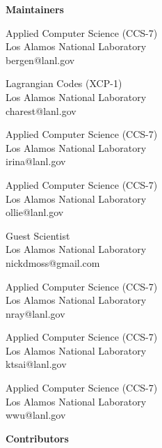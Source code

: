 \begin{multicols}{2}
{\huge \textbf{Maintainers}}

\vspace{0.25cm}

{Applied Computer Science (CCS-7)\\
Los Alamos National Laboratory\\
bergen@lanl.gov}

{Lagrangian Codes (XCP-1)\\
Los Alamos National Laboratory\\
charest@lanl.gov}

{Applied Computer Science (CCS-7)\\
Los Alamos National Laboratory\\
irina@lanl.gov}

{Applied Computer Science (CCS-7)\\
Los Alamos National Laboratory\\
ollie@lanl.gov}

{Guest Scientist\\
Los Alamos National Laboratory\\
nickdmoss@gmail.com}

{Applied Computer Science (CCS-7)\\
Los Alamos National Laboratory\\
nray@lanl.gov}

{Applied Computer Science (CCS-7)\\
Los Alamos National Laboratory\\
ktsai@lanl.gov}

{Applied Computer Science (CCS-7)\\
Los Alamos National Laboratory\\
wwu@lanl.gov}

\vfill
\columnbreak

{\huge \textbf{Contributors}}

\vspace{0.25cm}


\vfill
\end{multicols}

\pagebreak

